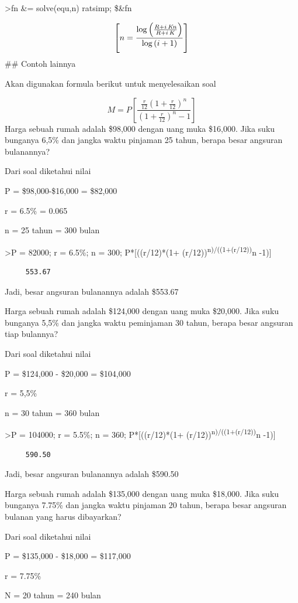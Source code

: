 \documentclass[
]{book}
\begin{document}
\textgreater fn \&= solve(equ,n) \textbar{} ratsimp; \$\&fn

\[\left[ n=\frac{\log \left(\frac{R+i\,{\it Kn}}{R+i\,K}\right)}{  \log \left(i+1\right)} \right] \]\#\# Contoh lainnya

Akan digunakan formula berikut untuk menyelesaikan soal

\[M = P [\frac {\frac {r}{12}(1+ \frac {r}{12})^n}{(1+\frac{r}{12})^n -1}]\]Harga sebuah rumah adalah \$98,000 dengan uang muka \$16,000. Jika suku bunganya 6,5\% dan jangka waktu pinjaman 25 tahun, berapa besar angsuran bulanannya?

Dari soal diketahui nilai

P = \$98,000-\$16,000 = \$82,000

r = 6.5\% = 0.065

n = 25 tahun = 300 bulan

\textgreater P = 82000; r = 6.5\%; n = 300; P*{[}((r/12)*(1+ (r/12))\textsuperscript{n)/((1+(r/12))}n -1){]}

\begin{verbatim}
     553.67 
\end{verbatim}

Jadi, besar angsuran bulanannya adalah \$553.67

Harga sebuah rumah adalah \$124,000 dengan uang muka \$20,000. Jika suku bunganya 5,5\% dan jangka waktu peminjaman 30 tahun, berapa besar angsuran tiap bulannya?

Dari soal diketahui nilai

P = \$124,000 - \$20,000 = \$104,000

r = 5,5\%

n = 30 tahun = 360 bulan

\textgreater P = 104000; r = 5.5\%; n = 360; P*{[}((r/12)*(1+ (r/12))\textsuperscript{n)/((1+(r/12))}n -1){]}

\begin{verbatim}
     590.50 
\end{verbatim}

Jadi, besar angsuran bulanannya adalah \$590.50

Harga sebuah rumah adalah \$135,000 dengan uang muka \$18,000. Jika suku bunganya 7.75\% dan jangka waktu pinjaman 20 tahun, berapa besar angsuran bulanan yang harus dibayarkan?

Dari soal diketahui nilai

P = \$135,000 - \$18,000 = \$117,000

r = 7.75\%

N = 20 tahun = 240 bulan
\end{document}
